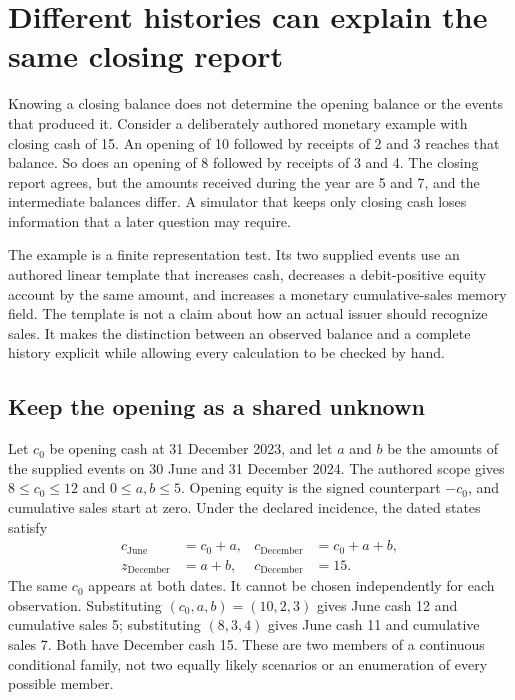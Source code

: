 \section{Different histories can explain the same closing report}
\label{sec:conditional-history-families}

Knowing a closing balance does not determine the opening balance or the events
that produced it. Consider a deliberately authored monetary example with
closing cash of 15. An opening of 10 followed by receipts of 2 and 3 reaches
that balance. So does an opening of 8 followed by receipts of 3 and 4. The
closing report agrees, but the amounts received during the year are 5 and 7,
and the intermediate balances differ. A simulator that keeps only closing
cash loses information that a later question may require.

The example is a finite representation test. Its two supplied events use an
authored linear template that increases cash, decreases a debit-positive equity
account by the same amount, and increases a monetary cumulative-sales memory
field. The template is not a claim about how an actual issuer should recognize
sales. It makes the distinction between an observed balance and a complete
history explicit while allowing every calculation to be checked by hand.

\subsection{Keep the opening as a shared unknown}

Let \(c_0\) be opening cash at 31 December 2023, and let \(a\) and \(b\)
be the amounts of the supplied events on 30 June and 31 December 2024.
The authored scope gives \(8\leq c_0\leq12\) and
\(0\leq a,b\leq5\). Opening equity is the signed counterpart
\(-c_0\), and cumulative sales start at zero. Under the declared incidence,
the dated states satisfy
\begin{align}
\label{eq:conditional-history-example}
 c_{\mathrm{June}}&=c_0+a, & c_{\mathrm{December}}&=c_0+a+b,\\
 z_{\mathrm{December}}&=a+b, & c_{\mathrm{December}}&=15.
\end{align}
The same \(c_0\) appears at both dates. It cannot be chosen independently
for each observation. Substituting \((c_0,a,b)=(10,2,3)\) gives June cash
12 and cumulative sales 5; substituting \((8,3,4)\) gives June cash 11 and
cumulative sales 7. Both have December cash 15. These are two members of a
continuous conditional family, not two equally likely scenarios or an
enumeration of every possible member.

